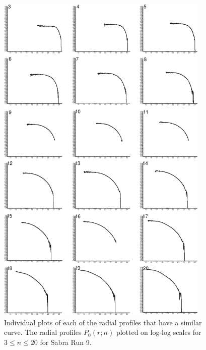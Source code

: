 \begin{figure}[!hpt]
    \begin{center}
     \includegraphics[width=4in]{allplots.eps}
     \end{center}
  \caption{Individual plots of each of the radial profiles that have a similar curve. The radial profiles $P_0(r;n)$ plotted on log-log scales for $3\leq n \leq 20$ for Sabra Run 9.} \label{fig: all plots}
\end{figure}

